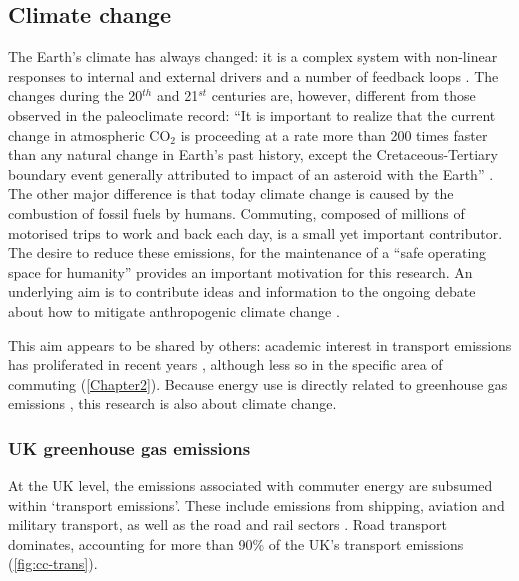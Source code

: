 \subsection{Climate change}
The Earth's climate has always changed: it is a complex system with non-linear
responses to internal and external drivers and a number of feedback loops
\citep{IPCC2007}. The changes during the 20$^{th}$ and 21$^{st}$ centuries are,
however, different from those observed in the paleoclimate record: ``It is
important to realize that the
current change in atmospheric CO$_{2}$ is proceeding at a rate more than 200
times faster than any natural change in Earth's past history, except
the Cretaceous-Tertiary boundary event generally attributed to impact of an
asteroid with the Earth'' \citep{Hay2011}. The other major difference is that
today climate change is caused by the combustion of fossil fuels by humans.
Commuting, composed of millions of motorised trips to work and back each day, is
a small yet important contributor. The desire to reduce these emissions, for the
maintenance of a ``safe operating space for humanity'' \citep{Rockstrom2009}
provides an important motivation for this research. An underlying aim is to
contribute ideas and information to the ongoing debate about how to mitigate
anthropogenic climate change \citep{Matschoss2011}.


This aim appears to be shared by others:
academic interest in transport emissions has proliferated in recent years
\citep{Akerman2006, Chapman2007, Schwanen2011}, although less so in the
specific area of commuting (\cref{Chapter2}).
Because energy use is directly related to greenhouse gas
emissions \citep{MacKay2009}, this research is also about climate change.

\subsubsection*{UK greenhouse gas emissions}
At the UK level, the emissions associated with commuter energy are subsumed
within `transport emissions'. These include emissions from shipping, aviation
and military transport, as well as the road and rail sectors
\citep{Decc2011t}. Road transport dominates,
accounting for more than 90\% of the UK's transport emissions
(\cref{fig:cc-trans}).

